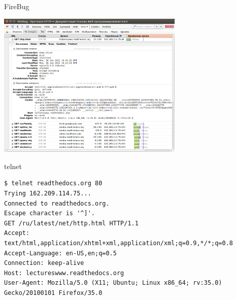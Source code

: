 \begin{frame}{FireBug}
    \begin{center}
        \includegraphics[width=3.5in]{media/firebug1.png}
    \end{center}
\end{frame}

\begin{frame}[fragile]{telnet}
    \begin{Verbatim}[fontsize=\scriptsize]
$ telnet readthedocs.org 80
Trying 162.209.114.75...
Connected to readthedocs.org.
Escape character is '^]'.
GET /ru/latest/net/http.html HTTP/1.1
Accept: text/html,application/xhtml+xml,application/xml;q=0.9,*/*;q=0.8
Accept-Language: en-US,en;q=0.5
Connection: keep-alive
Host: lectureswww.readthedocs.org
User-Agent: Mozilla/5.0 (X11; Ubuntu; Linux x86_64; rv:35.0) Gecko/20100101 Firefox/35.0
    \end{Verbatim}
\end{frame}


